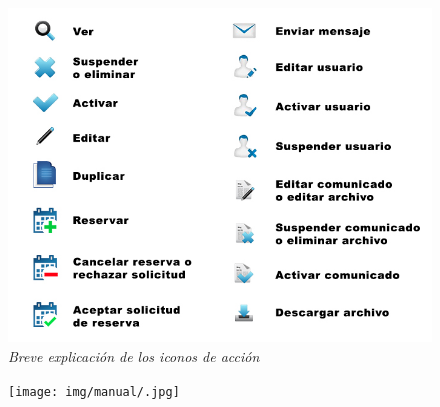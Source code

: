\begin{figure}
\centering
  \includegraphics[scale=.50]{img/manual/explicacion-iconos.jpg}
  \caption{\textit{Breve explicación de los iconos de acción}}
  \label{fig:explicacion-iconos}
\end{figure}






\begin{figure}
\centering
  \texttt{[image: img/manual/.jpg]}
  \caption{\textit{}}
  \label{fig:}
\end{figure}






